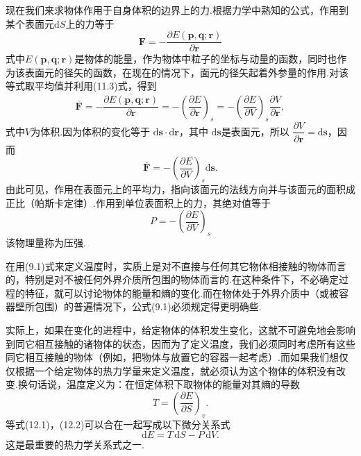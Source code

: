 现在我们来求物体作用于自身体积的边界上的力.根据力学中熟知的公式，作用到某个表面元$\mathrm{d}S$上的力等于
\begin{equation*}
  \boldsymbol{F}
  =-\frac{\partial E(\boldsymbol{p},\boldsymbol{q};\boldsymbol{r})}
  {\partial\boldsymbol{r}}
\end{equation*}
式中$E(\boldsymbol{p},\boldsymbol{q};\boldsymbol{r})$是物体的能量，作为物体中粒子的坐标与动量的函数，同时也作为该表面元的径矢的函数，在现在的情况下，面元的径矢起着外参量的作用.对该等式取平均值并利用(11.3)式，得到
\begin{equation*}
  \overline{\boldsymbol{F}}
  =-\overline{\frac{\partial E(\boldsymbol{p},\boldsymbol{q};\boldsymbol{r})}
  {\partial\boldsymbol{r}}}
  =-\left(\frac{\partial E}{\partial\boldsymbol{r}}\right)_s
  =-\left(\frac{\partial E}{\partial V}\right)_s
  \frac{\partial V}{\partial\boldsymbol{r}},
\end{equation*}
式中$V$为体积.因为体积的变化等于
$\mathrm{d}\boldsymbol{s}\cdot\mathrm{d}\boldsymbol{r}$，其中
$\mathrm{d}\boldsymbol{s}$是表面元，所以
$\dfrac{\partial V}{\partial\boldsymbol{r}}=\mathrm{d}\boldsymbol{s}$，因而
\begin{equation*}
  \overline{\boldsymbol{F}}
  =-\left(\frac{\partial E}{\partial V}\right)_s\mathrm{d}\boldsymbol{s}.
\end{equation*}
由此可见，作用在表面元上的平均力，指向该面元的法线方向并与该面元的面积成正比（帕斯卡定律）.作用到单位表面积上的力，其绝对值等于
\begin{equation}
  P=-\left(\frac{\partial E}{\partial V}\right)_s
\end{equation}
该物理量称为压强.

在用(9.1)式来定义温度时，实质上是对不直接与任何其它物体相接触的物体而言的，特别是对不被任何外界介质所包围的物体而言的.在这种条件下，不必确定过程的特征，就可以讨论物体的能量和熵的变化.而在物体处于外界介质中（或被容器壁所包围）的普遍情况下，公式(9.1)必须规定得更明确些.

实际上，如果在变化的进程中，给定物体的体积发生变化，这就不可避免地会影响到同它相互接触的诸物体的状态，因而为了定义温度，我们必须同时考虑所有这些同它相互接触的物体（例如，把物体与放置它的容器一起考虑）.而如果我们想仅仅根据一个给定物体的热力学量来定义温度，就必须认为这个物体的体积没有改变.换句话说，温度定义为：在恒定体积下取物体的能量对其熵的导数
\begin{equation}
  T=\left(\frac{\partial E}{\partial S}\right)_v.
\end{equation}
等式(12.1)，(12.2)可以合在一起写成以下微分关系式
\begin{equation}
  \mathrm{d}E=T\,\mathrm{d}S-P\,\mathrm{d}V.
\end{equation}
这是最重要的热力学关系式之一.

